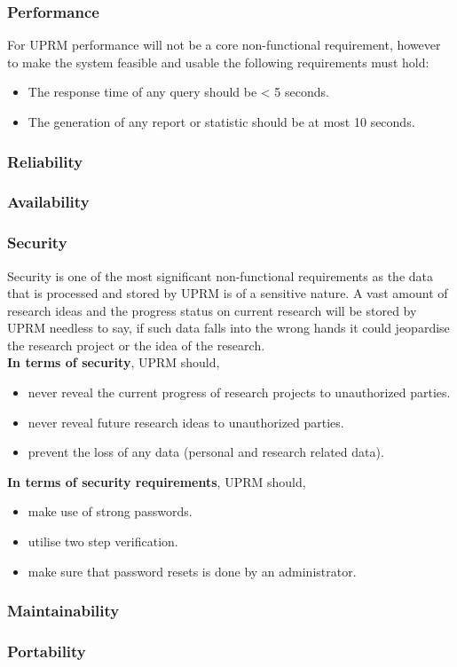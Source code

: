
\subsubsection{Performance}
For UPRM performance will not be a core non-functional requirement, however to make the system feasible and usable the following requirements must hold:

\begin{itemize}
	\item The response time of any query should be \textless{}  5 seconds.
	\item The generation of any report or statistic should be at most 10 seconds.
\end{itemize}

\subsubsection{Reliability}

\subsubsection{Availability}

\subsubsection{Security}
Security is one of the most significant non-functional requirements as the data that is processed and stored by UPRM is of a sensitive nature. 
A vast amount of research ideas and the progress status on current research will be stored by UPRM needless to say, if such data falls into the wrong hands it could jeopardise the research project or the idea of the research.\\ 

\textbf{In terms of security}, UPRM should,
	\begin{itemize} 
		\item never reveal the current progress of research projects to unauthorized parties.
		\item never reveal future research ideas to unauthorized parties.
		\item prevent the loss of any data (personal and research related data).
	\end{itemize}

\textbf{In terms of security requirements}, UPRM should,
	\begin{itemize} 
		\item make use of strong passwords.
		\item utilise two step verification.
		\item make sure that password resets is done by an administrator.
	\end{itemize}

\subsubsection{Maintainability}

\subsubsection{Portability}